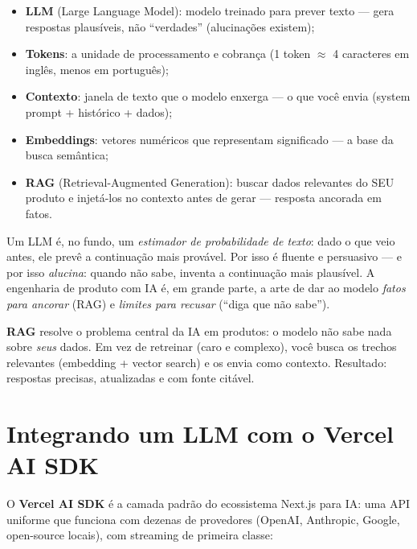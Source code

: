 \begin{itemize}[leftmargin=*, itemsep=0.4em]
  \item \textbf{LLM} (Large Language Model): modelo treinado para prever texto — gera respostas plausíveis, não ``verdades'' (alucinações existem);
  \item \textbf{Tokens}: a unidade de processamento e cobrança (1 token $\approx$ 4 caracteres em inglês, menos em português);
  \item \textbf{Contexto}: janela de texto que o modelo enxerga — o que você envia (system prompt + histórico + dados);
  \item \textbf{Embeddings}: vetores numéricos que representam significado — a base da busca semântica;
  \item \textbf{RAG} (Retrieval-Augmented Generation): buscar dados relevantes do SEU produto e injetá-los no contexto antes de gerar — resposta ancorada em fatos.
\end{itemize}

\begin{caixaconceito}
Um LLM é, no fundo, um \emph{estimador de probabilidade de texto}: dado o que
veio antes, ele prevê a continuação mais provável. Por isso é fluente e
persuasivo — e por isso \emph{alucina}: quando não sabe, inventa a continuação
mais plausível. A engenharia de produto com IA é, em grande parte, a arte de
dar ao modelo \emph{fatos para ancorar} (RAG) e \emph{limites para recusar}
(``diga que não sabe'').
\end{caixaconceito}

\begin{caixaconceito}
\textbf{RAG} resolve o problema central da IA em produtos: o modelo não sabe
nada sobre \emph{seus} dados. Em vez de retreinar (caro e complexo), você
busca os trechos relevantes (embedding + vector search) e os envia como
contexto. Resultado: respostas precisas, atualizadas e com fonte citável.
\end{caixaconceito}

\section{Integrando um LLM com o Vercel AI SDK}

O \textbf{Vercel AI SDK} é a camada padrão do ecossistema Next.js para IA:
uma API uniforme que funciona com dezenas de provedores (OpenAI, Anthropic,
Google, open-source locais), com streaming de primeira classe:

